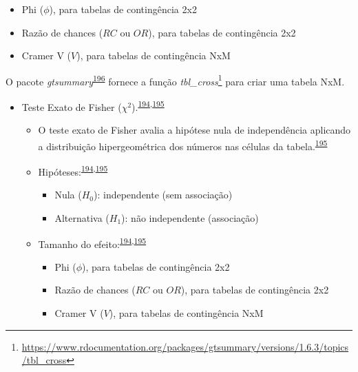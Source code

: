 \documentclass[
  a4paper,
]{book}
\renewcommand{\href}[2]{#2\footnote{\url{#1}}}
\newenvironment{infobox}[1]
  {
  \begin{itemize}
  \renewcommand{\labelitemi}{
    \raisebox{-.7\height}[0pt][0pt]{
      {\setkeys{Gin}{width=3em,keepaspectratio}
        \texttt{[image: \#1]}}
    }
  }
  \setlength{\fboxsep}{1em}
  \begin{blackbox}
  \item
  }
  {
  \end{blackbox}
  \end{itemize}
  }
\begin{document}
\begin{itemize}
\begin{itemize}
    \begin{itemize}
    \item
      Phi (\(\phi\)), para tabelas de contingência 2x2
    \item
      Razão de chances (\(RC\) ou \(OR\)), para tabelas de contingência 2x2
    \item
      Cramer V (\(V\)), para tabelas de contingência NxM
    \end{itemize}
  \end{itemize}
\end{itemize}

\begin{infobox}{images/Rlogo}
O pacote \emph{gtsummary}\textsuperscript{\protect\hyperlink{ref-gtsummary}{196}} fornece a função \href{https://www.rdocumentation.org/packages/gtsummary/versions/1.6.3/topics/tbl_cross}{\emph{tbl\_cross}} para criar uma tabela NxM.

\end{infobox}

\begin{itemize}
\item
  Teste Exato de Fisher (\(\chi^2\)).\textsuperscript{\protect\hyperlink{ref-McHugh2013}{194},\protect\hyperlink{ref-Kim2017a}{195}}

  \begin{itemize}
  \item
    O teste exato de Fisher avalia a hipótese nula de independência aplicando a distribuição hipergeométrica dos números nas células da tabela.\textsuperscript{\protect\hyperlink{ref-Kim2017a}{195}}
  \item
    Hipóteses:\textsuperscript{\protect\hyperlink{ref-McHugh2013}{194},\protect\hyperlink{ref-Kim2017a}{195}}

    \begin{itemize}
    \item
      Nula (\(H_{0}\)): independente (sem associação)
    \item
      Alternativa (\(H_{1}\)): não independente (associação)
    \end{itemize}
  \item
    Tamanho do efeito:\textsuperscript{\protect\hyperlink{ref-McHugh2013}{194},\protect\hyperlink{ref-Kim2017a}{195}}

    \begin{itemize}
    \item
      Phi (\(\phi\)), para tabelas de contingência 2x2
    \item
      Razão de chances (\(RC\) ou \(OR\)), para tabelas de contingência 2x2
    \item
      Cramer V (\(V\)), para tabelas de contingência NxM
    \end{itemize}
  \end{itemize}
\end{itemize}
\end{document}
